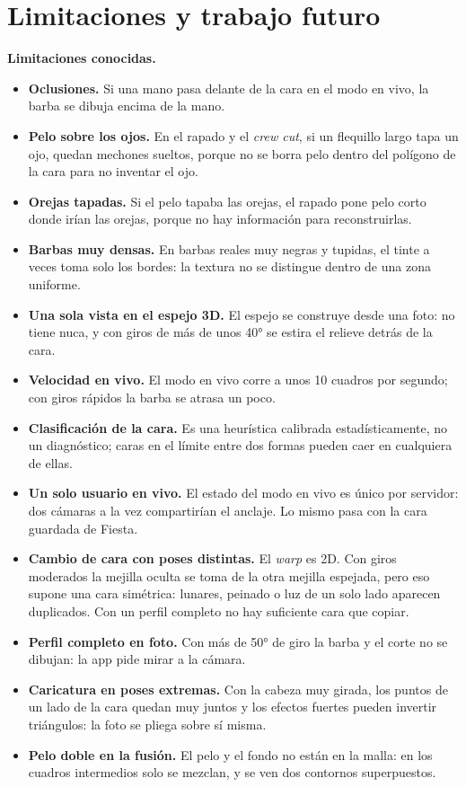 \section{Limitaciones y trabajo futuro}
\label{sec:limitaciones}

\textbf{Limitaciones conocidas.}
\begin{itemize}
  \item \textbf{Oclusiones.} Si una mano pasa delante de la cara en el modo en vivo, la barba se dibuja encima de la mano.
  \item \textbf{Pelo sobre los ojos.} En el rapado y el \emph{crew cut}, si un flequillo largo tapa un ojo, quedan mechones sueltos, porque no se borra pelo dentro del polígono de la cara para no inventar el ojo.
  \item \textbf{Orejas tapadas.} Si el pelo tapaba las orejas, el rapado pone pelo corto donde irían las orejas, porque no hay información para reconstruirlas.
  \item \textbf{Barbas muy densas.} En barbas reales muy negras y tupidas, el tinte a veces toma solo los bordes: la textura no se distingue dentro de una zona uniforme.
  \item \textbf{Una sola vista en el espejo 3D.} El espejo se construye desde una foto: no tiene nuca, y con giros de más de unos 40° se estira el relieve detrás de la cara.
  \item \textbf{Velocidad en vivo.} El modo en vivo corre a unos 10 cuadros por segundo; con giros rápidos la barba se atrasa un poco.
  \item \textbf{Clasificación de la cara.} Es una heurística calibrada estadísticamente, no un diagnóstico; caras en el límite entre dos formas pueden caer en cualquiera de ellas.
  \item \textbf{Un solo usuario en vivo.} El estado del modo en vivo es único por servidor: dos cámaras a la vez compartirían el anclaje. Lo mismo pasa con la cara guardada de Fiesta.
  \item \textbf{Cambio de cara con poses distintas.} El \emph{warp} es 2D. Con giros moderados la mejilla oculta se toma de la otra mejilla espejada, pero eso supone una cara simétrica: lunares, peinado o luz de un solo lado aparecen duplicados. Con un perfil completo no hay suficiente cara que copiar.
  \item \textbf{Perfil completo en foto.} Con más de 50° de giro la barba y el corte no se dibujan: la app pide mirar a la cámara.
  \item \textbf{Caricatura en poses extremas.} Con la cabeza muy girada, los puntos de un lado de la cara quedan muy juntos y los efectos fuertes pueden invertir triángulos: la foto se pliega sobre sí misma.
  \item \textbf{Pelo doble en la fusión.} El pelo y el fondo no están en la malla: en los cuadros intermedios solo se mezclan, y se ven dos contornos superpuestos.
\end{itemize}

